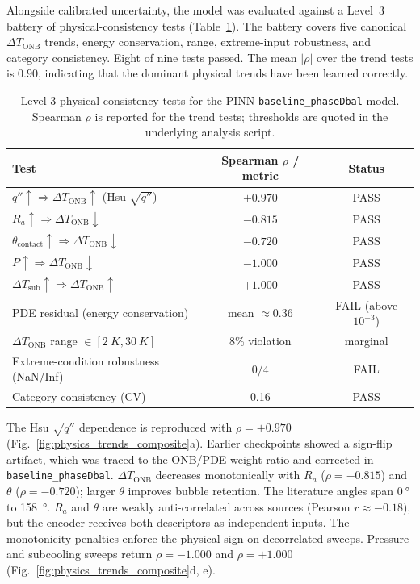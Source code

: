 Alongside calibrated uncertainty, the model was evaluated against a
Level~3 battery of physical-consistency tests
(Table~\ref{tab:physics}). The battery covers five canonical
$\Delta T_{\mathrm{ONB}}$ trends, energy conservation, range,
extreme-input robustness, and category consistency. Eight of nine
tests passed. The mean $|\rho|$ over the trend tests is $0.90$,
indicating that the dominant physical trends have been learned
correctly.

\begin{table}[!htbp]
\centering
\caption{Level 3 physical-consistency tests for the PINN
  \texttt{baseline\_phaseDbal} model. Spearman $\rho$ is reported for the
  trend tests; thresholds are quoted in the underlying analysis script.}
\label{tab:physics}
\small
\begin{tabular}{lcc}
\hline
Test & Spearman $\rho$ / metric & Status \\
\hline
$q''\uparrow \Rightarrow \Delta T_{\mathrm{ONB}}\uparrow$ (Hsu $\sqrt{q''}$)
   & $+0.970$ & PASS \\
$R_a\uparrow \Rightarrow \Delta T_{\mathrm{ONB}}\downarrow$
   & $-0.815$ & PASS \\
$\theta_{\mathrm{contact}}\uparrow \Rightarrow \Delta T_{\mathrm{ONB}}\downarrow$
   & $-0.720$ & PASS \\
$P\uparrow \Rightarrow \Delta T_{\mathrm{ONB}}\downarrow$
   & $-1.000$ & PASS \\
$\Delta T_{\mathrm{sub}}\uparrow \Rightarrow \Delta T_{\mathrm{ONB}}\uparrow$
   & $+1.000$ & PASS \\
PDE residual (energy conservation) & mean $\approx 0.36$ & FAIL (above $10^{-3}$) \\
$\Delta T_{\mathrm{ONB}}$ range $\in [\SI{2}{K},\SI{30}{K}]$
   & 8\% violation & marginal \\
Extreme-condition robustness (NaN/Inf) & 0/4 & FAIL \\
Category consistency (CV) & 0.16 & PASS \\
\hline
\end{tabular}
\end{table}

The Hsu $\sqrt{q''}$ dependence is reproduced with $\rho=+0.970$
(Fig.~\ref{fig:physics_trends_composite}a). Earlier checkpoints
showed a sign-flip artifact, which was traced to the ONB/PDE weight
ratio and corrected in \texttt{baseline\_phaseDbal}.
$\Delta T_{\mathrm{ONB}}$ decreases monotonically with $R_a$
($\rho=-0.815$) and $\theta$ ($\rho=-0.720$); larger $\theta$
improves bubble retention. The literature angles span
$\SI{0}{\degree}$ to \SI{158}{\degree}. $R_a$ and $\theta$ are weakly
anti-correlated across sources (Pearson $r\approx-0.18$), but the
encoder receives both descriptors as independent inputs. The
monotonicity penalties enforce the physical sign on decorrelated
sweeps. Pressure and subcooling sweeps return $\rho=-1.000$ and
$\rho=+1.000$ (Fig.~\ref{fig:physics_trends_composite}d, e).

